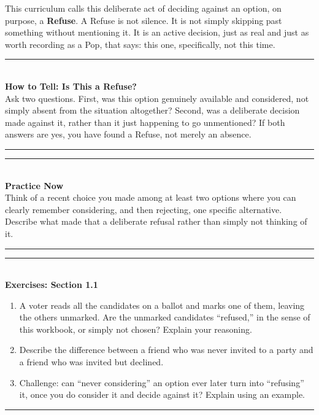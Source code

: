 \documentclass[11pt]{book}
\newenvironment{algorithmproc}[1]{%
\vspace{0.6em}\noindent\rule{\linewidth}{0.6pt}\\[0.2em]\textbf{How to Tell: #1}\\[0.3em]}%
{\\[0.2em]\noindent\rule{\linewidth}{0.6pt}\vspace{0.6em}}
\newenvironment{practicenow}{%
\vspace{0.6em}\noindent\rule{\linewidth}{0.6pt}\\[0.2em]\textbf{Practice Now}\\[0.3em]}%
{\\[0.2em]\noindent\rule{\linewidth}{0.6pt}\vspace{0.6em}}
\newenvironment{exercisebox}[1]{%
\vspace{0.8em}\noindent\rule{\linewidth}{0.6pt}\\[0.2em]\textbf{Exercises: #1}\\[0.3em]%
\begin{enumerate}[label=\arabic*., itemsep=0.4em]}%
{\end{enumerate}\noindent\rule{\linewidth}{0.6pt}\vspace{0.6em}}
\begin{document}
\begin{center}
\end{center}

This curriculum calls this deliberate act of deciding against an option, on purpose, a \textbf{Refuse}. A Refuse is not silence. It is not simply skipping past something without mentioning it. It is an active decision, just as real and just as worth recording as a Pop, that says: this one, specifically, not this time.

\begin{algorithmproc}{Is This a Refuse?}
Ask two questions. First, was this option genuinely available and considered, not simply absent from the situation altogether? Second, was a deliberate decision made against it, rather than it just happening to go unmentioned? If both answers are yes, you have found a Refuse, not merely an absence.
\end{algorithmproc}

\begin{practicenow}
Think of a recent choice you made among at least two options where you can clearly remember considering, and then rejecting, one specific alternative. Describe what made that a deliberate refusal rather than simply not thinking of it.
\end{practicenow}

\begin{exercisebox}{Section 1.1}
\item A voter reads all the candidates on a ballot and marks one of them, leaving the others unmarked. Are the unmarked candidates ``refused,'' in the sense of this workbook, or simply not chosen? Explain your reasoning.
\item Describe the difference between a friend who was never invited to a party and a friend who was invited but declined.
\item Challenge: can ``never considering'' an option ever later turn into ``refusing'' it, once you do consider it and decide against it? Explain using an example.
\end{exercisebox}
\end{document}

